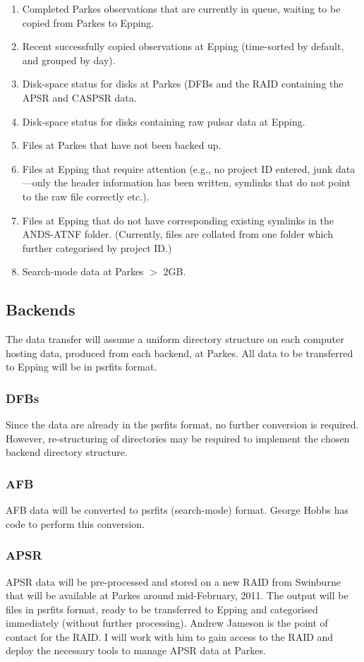 \documentclass[a4paper,11pt]{article}
\begin{document}
\begin{enumerate}
\item Completed Parkes observations that are currently in queue, waiting to be copied from Parkes to Epping.
\item Recent successfully copied observations at Epping (time-sorted by default, and grouped by day).
\item Disk-space status for disks at Parkes (DFBs and the RAID containing the APSR and CASPSR data.
\item Disk-space status for disks containing raw pulsar data at Epping.
\item Files at Parkes that have not been backed up.
\item Files at Epping that require attention (e.g., no project ID entered, junk data---only the header information has been written, symlinks that do not point to the raw file correctly etc.).
\item Files at Epping that do not have corresponding existing symlinks in the ANDS-ATNF folder. (Currently, files are collated from one folder which further categorised by project ID.)
\item Search-mode data at Parkes $>$ 2GB.
\end{enumerate}

\subsection{Backends}
The data transfer will assume a uniform directory structure on each computer hosting data, produced from each backend, at Parkes. All data to be transferred to Epping will be in psrfits format.

\subsubsection{DFBs}
Since the data are already in the psrfits format, no further conversion is required. However, re-structuring of directories may be required to implement the chosen backend directory structure.

\subsubsection{AFB}
AFB data will be converted to psrfits (search-mode) format. George Hobbs has code to perform this conversion.

\subsubsection{APSR}
APSR data will be pre-processed and stored on a new RAID from Swinburne that will be available at Parkes around mid-February, 2011. The output will be files in psrfits format, ready to be transferred to Epping and categorised immediately (without further processing). Andrew Jameson is the point of contact for the RAID. I will work with him to gain access to the RAID and deploy the necessary tools to manage APSR data at Parkes.
\end{document}
